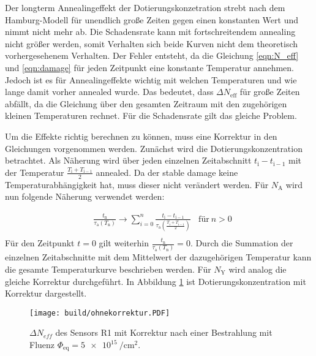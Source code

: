 Der longterm Annealingeffekt der Dotierungskonzetration strebt nach dem Hamburg-Modell
für unendlich große Zeiten gegen einen konstanten Wert und nimmt nicht mehr
ab. Die Schadensrate kann mit fortschreitendem annealing nicht
größer werden, somit Verhalten sich beide Kurven nicht dem theoretisch
vorhergesehenem Verhalten.
Der Fehler entsteht, da die Gleichung \ref{eqn:N_eff} und \ref{eqn:damage} für jeden
Zeitpunkt eine konstante Temperatur annehmen. Jedoch ist es für Annealingeffekte
wichtig mit welchen Temperaturen und wie lange damit vorher annealed wurde.
Das bedeutet, dass $\Delta N_{\mathrm{eff}}$ für große Zeiten abfällt, da die Gleichung über den
gesamten Zeitraum mit den zugehörigen kleinen Temperaturen rechnet. Für
die Schadensrate gilt das gleiche Problem.

Um die Effekte richtig berechnen zu können, muss eine Korrektur in den
Gleichungen vorgenommen werden.
Zunächst wird die Dotierungskonzentration betrachtet. Als Näherung wird über
jeden einzelnen Zeitabschnitt $t_{\mathrm{i}} - t_{\mathrm{i-1}}$ mit der
Temperatur $\frac{T_{\mathrm{i}} +T_{\mathrm{i-1}}}{2}$ annealed.
Da der stable damage keine Temperaturabhängigkeit hat, muss dieser nicht
verändert werden. Für $N_{\mathrm{A}}$ wird nun folgende Näherung
verwendet werden:

\begin{align}
  &\frac{t_{\mathrm{n}}}{\tau_{\mathrm{a}}(T_{\mathrm{n}})} \rightarrow \sum_{i=0}^n  \frac{t_{\mathrm{i}} - t_{\mathrm{i-1}}}{\tau_{\mathrm{a}}(\frac{T_{\mathrm{i}} +T_{\mathrm{i-1}}}{2})} \:\:\:\: \text{für} \: n>0 \\
\end{align}
Für den Zeitpunkt $t=0$ gilt weiterhin $\frac{t_{\mathrm{n}}}{\tau_{\mathrm{a}}(T_{\mathrm{n}})} = 0$.
Durch die Summation der einzelnen Zeitabschnitte mit dem Mittelwert der dazugehörigen
Temperatur kann die gesamte Temperaturkurve beschrieben werden. Für $N_{\mathrm{Y}}$
wird analog die gleiche Korrektur durchgeführt.
In Abbildung \ref{fig:korrektur_N_eff} ist Dotierungskonzentration mit Korrektur dargestellt.


\begin{figure}
    \texttt{[image: build/ohnekorrektur.PDF]}
\caption{$\Delta N_{eff}$ des Sensors R1 mit Korrektur nach einer Bestrahlung mit Fluenz $\Phi_{\mathrm{eq}} = \SI{5e15}{\per\centi\meter\squared}.$}
\label{fig:korrektur_N_eff}
\end{figure}



